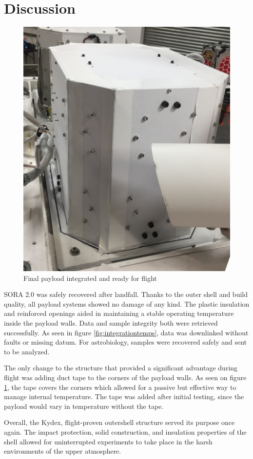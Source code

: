 \section{Discussion}
\label{sec:Discussion}
\begin{figure}[h!]
	\begin{center}
		\includegraphics[width=70 mm, scale=1]{figures/payload_integrated.JPG}
		\caption{Final payload integrated and ready for flight}
		\label{fig:payload_int}
	\end{center}
\end{figure}

SORA 2.0 was safely recovered after landfall.  Thanks to the outer shell and build quality, all payload systems showed no damage of any kind.  
The plastic insulation and reinforced openings aided in maintaining a stable operating temperature inside the payload walls.  
Data and sample integrity both were retrieved successfully.  As seen in figure \ref{fig:integrationtemps}, data was downlinked without faults or 
missing datum. For astrobiology, samples were recovered safely and sent to be analyzed.  

The only change to the structure that provided a significant advantage during flight was adding duct tape to the corners of the payload walls.  As seen on figure \ref{fig:payload_int}, the tape covers the corners which allowed for a passive but effective way to manage internal temperature.  The tape was added after initial testing, since the payload would vary in temperature without the tape.  

Overall, the Kydex, flight-proven outershell structure served its purpose once again.  The impact protection, solid construction, and insulation properties of the shell allowed for uninterrupted experiments to take place in the harsh environments of the upper atmosphere.